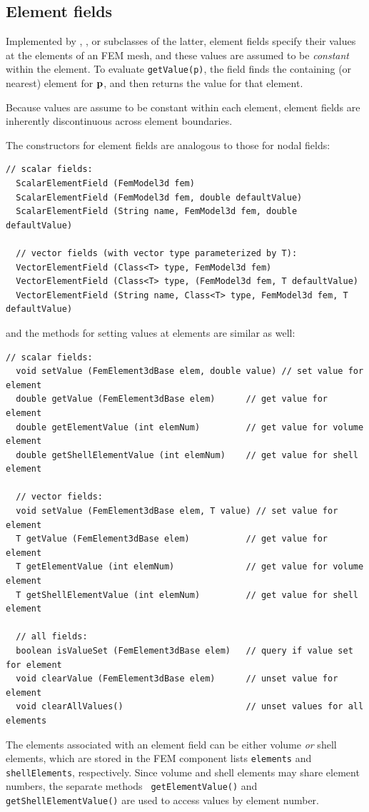 \subsection{Element fields}

Implemented by
,
, 
or subclasses of the latter, element fields specify their values at
the elements of an FEM mesh, and these values are assumed to be {\it
constant} within the element. To evaluate {\tt getValue(p)}, the field
finds the containing (or nearest) element for ${\bf p}$, and then returns
the value for that element.

\begin{sideblock}
Because values are assume to be constant within each element, element
fields are inherently discontinuous across element boundaries.
\end{sideblock}

The constructors for element fields are analogous to those
for nodal fields:
%
\begin{lstlisting}[]
  // scalar fields:
  ScalarElementField (FemModel3d fem)
  ScalarElementField (FemModel3d fem, double defaultValue)
  ScalarElementField (String name, FemModel3d fem, double defaultValue)

  // vector fields (with vector type parameterized by T):
  VectorElementField (Class<T> type, FemModel3d fem)
  VectorElementField (Class<T> type, (FemModel3d fem, T defaultValue)
  VectorElementField (String name, Class<T> type, FemModel3d fem, T defaultValue)
\end{lstlisting}
%
and the methods for setting values at elements are similar as
well:
%
\begin{lstlisting}[]
  // scalar fields:
  void setValue (FemElement3dBase elem, double value) // set value for element
  double getValue (FemElement3dBase elem)      // get value for element
  double getElementValue (int elemNum)         // get value for volume element
  double getShellElementValue (int elemNum)    // get value for shell element

  // vector fields:
  void setValue (FemElement3dBase elem, T value) // set value for element
  T getValue (FemElement3dBase elem)           // get value for element
  T getElementValue (int elemNum)              // get value for volume element
  T getShellElementValue (int elemNum)         // get value for shell element

  // all fields:
  boolean isValueSet (FemElement3dBase elem)   // query if value set for element
  void clearValue (FemElement3dBase elem)      // unset value for element
  void clearAllValues()                        // unset values for all elements
\end{lstlisting}
%
The elements associated with an element field can be either volume
{\it or} shell elements, which are stored in the FEM component lists
{\tt elements} and {\tt shellElements}, respectively. Since volume and
shell elements may share element numbers, the separate methods {\tt
getElementValue()} and {\tt getShellElementValue()} are used to access
values by element number.

